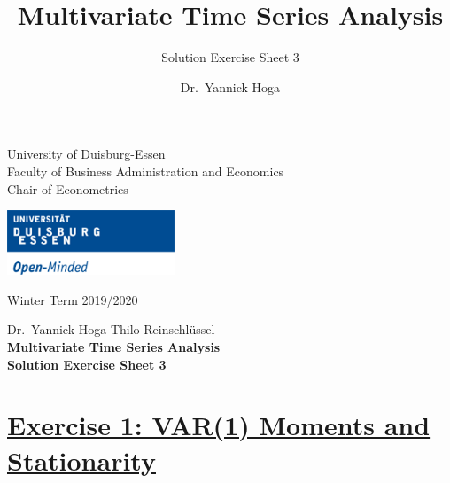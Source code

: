 \documentclass[12pt,a4paper]{article}
\title{Multivariate Time Series Analysis}
\subtitle{Solution Exercise Sheet 3}
\author{Dr.~Yannick Hoga}
\date{}
\newcommand{\tmpsection}[1]{}
\let\tmpsection=\section
\renewcommand{\section}[1]{\tmpsection{\underline{#1}} }
\begin{document}





\restoregeometry



\begin{minipage}{0.6\textwidth}
University of Duisburg-Essen\\
Faculty of Business Administration and Economics\\
Chair of Econometrics\\
\end{minipage}

	\begin{flushright}
	\vspace{-3cm}
	\includegraphics*[width=5cm]{Includes/duelogo_en.png}\\
	\vspace{.125cm}
	\end{flushright}
\hspace{-0.005cm}Winter Term 2019/2020

\vspace{0.05cm}

\begin{center}
	\vspace{.25cm}
	Dr.~Yannick Hoga \hspace{.5cm} Thilo Reinschlüssel \\
	\vspace{.25cm}
	\textbf{\Large{Multivariate Time Series Analysis}}\\
	\vspace{.25cm}
	\textbf{\large{Solution Exercise Sheet 3}}\\
	\vspace{.125cm}
\end{center}





\hypertarget{exercise-1-var1-moments-and-stationarity}{%
\section{Exercise 1: VAR(1) Moments and
Stationarity}\label{exercise-1-var1-moments-and-stationarity}}
\end{document}
